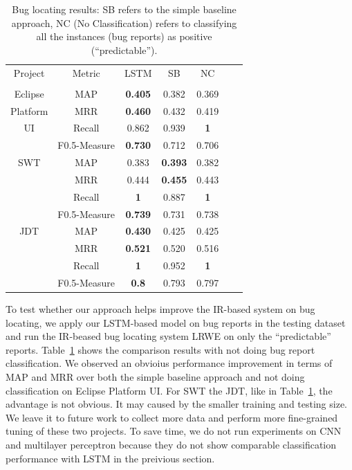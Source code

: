 \begin{table}[ht]
\centering
\caption{Bug locating results: SB refers to the simple baseline approach, NC (No Classification) refers to classifying all the instances (bug reports) as positive (``predictable'').}
\begin{adjustbox}{width=0.43\textwidth}
\begin{tabular}{|c|c|c|c|c|c|c|} \hline
Project & Metric & LSTM & SB & NC\\
& & & &\\ \hline
Eclipse & MAP & \textbf{0.405} & 0.382 & 0.369\\
Platform & MRR & \textbf{0.460} & 0.432 & 0.419\\
UI & Recall & 0.862 & 0.939 & \textbf{1}\\
& F0.5-Measure & \textbf{0.730} & 0.712 & 0.706\\ \hline
SWT & MAP & 0.383 & \textbf{0.393} & 0.382\\
& MRR & 0.444 & \textbf{0.455} & 0.443\\
& Recall & \textbf{1} & 0.887 & \textbf{1}\\
& F0.5-Measure & \textbf{0.739} & 0.731 & 0.738\\ \hline
JDT & MAP & \textbf{0.430} & 0.425 & 0.425\\
& MRR & \textbf{0.521} & 0.520 & 0.516\\
& Recall & \textbf{1} & 0.952 & \textbf{1}\\
& F0.5-Measure & \textbf{0.8} & 0.793 & 0.797\\ \hline
\end{tabular}
\end{adjustbox}
\label{tab:ranking results}
\end{table}

To test whether our approach helps improve the IR-based system on bug locating, we apply our LSTM-based model on bug reports in the testing dataset and run the IR-beased bug locating system LRWE on only the ``predictable'' reports. Table~\ref{tab:ranking results} shows the comparison results with not doing bug report classification. We observed an obvioius performance improvement in terms of MAP and MRR over both the simple baseline approach and not doing classification on Eclipse Platform UI. For SWT the JDT, like in Table~\ref{tab:ranking results}, the advantage is not obvious. It may caused by the smaller training and testing size. We leave it to future work to collect more data and perform more fine-grained tuning of these two projects. To save time, we do not run experiments on CNN and multilayer perceptron because they do not show comparable classification performance with LSTM in the preivious section.

